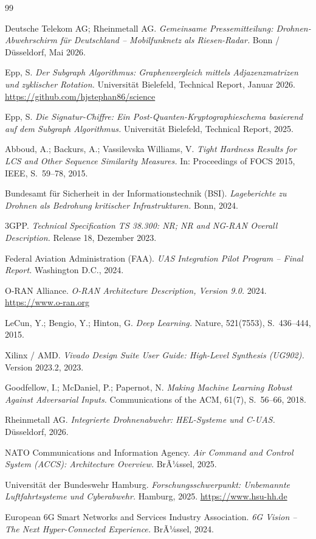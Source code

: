 ﻿\documentclass[a4paper,12pt]{article}
\theoremstyle{definition}
\begin{document}
\begin{thebibliography}{99}

Deutsche Telekom AG; Rheinmetall AG.
\textit{Gemeinsame Pressemitteilung: Drohnen-Abwehrschirm f\"ur Deutschland --
Mobilfunknetz als Riesen-Radar.}
Bonn / D\"usseldorf, Mai 2026.

Epp, S.
\textit{Der Subgraph Algorithmus: Graphenvergleich mittels Adjazenzmatrizen
und zyklischer Rotation.}
Universit\"at Bielefeld, Technical Report, Januar 2026.
\url{https://github.com/hjstephan86/science}

Epp, S.
\textit{Die Signatur-Chiffre: Ein Post-Quanten-Kryptographieschema
basierend auf dem Subgraph Algorithmus.}
Universit\"at Bielefeld, Technical Report, 2025.

Abboud, A.; Backurs, A.; Vassilevska Williams, V.
\textit{Tight Hardness Results for LCS and Other Sequence Similarity Measures.}
In: Proceedings of FOCS 2015, IEEE, S.~59--78, 2015.

Bundesamt f\"ur Sicherheit in der Informationstechnik (BSI).
\textit{Lageberichte zu Drohnen als Bedrohung kritischer Infrastrukturen.}
Bonn, 2024.

3GPP.
\textit{Technical Specification TS 38.300: NR; NR and NG-RAN Overall Description.}
Release 18, Dezember 2023.

Federal Aviation Administration (FAA).
\textit{UAS Integration Pilot Program -- Final Report.}
Washington D.C., 2024.

O-RAN Alliance.
\textit{O-RAN Architecture Description, Version 9.0.}
2024. \url{https://www.o-ran.org}

LeCun, Y.; Bengio, Y.; Hinton, G.
\textit{Deep Learning.}
Nature, 521(7553), S.~436--444, 2015.

Xilinx / AMD.
\textit{Vivado Design Suite User Guide: High-Level Synthesis (UG902).}
Version 2023.2, 2023.

Goodfellow, I.; McDaniel, P.; Papernot, N.
\textit{Making Machine Learning Robust Against Adversarial Inputs.}
Communications of the ACM, 61(7), S.~56--66, 2018.

Rheinmetall AG.
\textit{Integrierte Drohnenabwehr: HEL-Systeme und C-UAS.}
D\"usseldorf, 2026.

NATO Communications and Information Agency.
\textit{Air Command and Control System (ACCS): Architecture Overview.}
BrÃ¼ssel, 2025.

Universit\"at der Bundeswehr Hamburg.
\textit{Forschungsschwerpunkt: Unbemannte Luftfahrtsysteme und Cyberabwehr.}
Hamburg, 2025. \url{https://www.hsu-hh.de}

European 6G Smart Networks and Services Industry Association.
\textit{6G Vision -- The Next Hyper-Connected Experience.}
BrÃ¼ssel, 2024.

\end{thebibliography}
\end{document}
